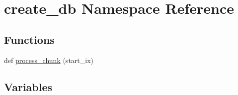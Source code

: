 \hypertarget{namespacecreate__db}{}\section{create\+\_\+db Namespace Reference}
\label{namespacecreate__db}
\subsection*{Functions}
\begin{DoxyCompactItemize}
\item 
def \hyperlink{namespacecreate__db_a0db532a727d6ffe9852f154e5d148a06}{process\+\_\+chunk} (start\+\_\+ix)
\end{DoxyCompactItemize}
\subsection*{Variables}
